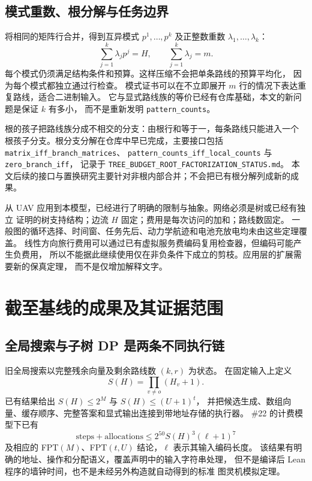\documentclass[UTF8,a4paper,11pt,fontset=fandol]{ctexart}
\theoremstyle{definition}
\newcommand{\repo}[1]{\nolinkurl{#1}}
\begin{document}
\subsection{模式重数、根分解与任务边界}

将相同的矩阵行合并，得到互异模式 $p^1,\ldots,p^k$ 及正整数重数
$\lambda_1,\ldots,\lambda_k$：
\begin{equation}\label{eq:patterns}
\sum_{j=1}^k\lambda_jp^j=H,\qquad
\sum_{j=1}^k\lambda_j=m.
\end{equation}
每个模式仍须满足结构条件和预算。这样压缩不会把单条路线的预算平均化，
因为每个模式都独立通过行检查。
模式证书可以在不立即展开 $m$ 行的情况下表达重复路线，适合二进制输入。
它与显式路线族的等价已经有仓库基础，本文的新问题是保证 $k$ 有多小，
而不是重新发明 \repo{pattern_counts}。

根的孩子把路线族分成不相交的分支：由根行和等于一，每条路线只能进入一个
根孩子分支。根分支分解在仓库中早已完成，主要接口包括
\repo{matrix_iff_branch_matrices}、
\repo{pattern_counts_iff_local_counts} 与 \repo{zero_branch_iff}，
记录于 \repo{TREE_BUDGET_ROOT_FACTORIZATION_STATUS.md}。
本文后续的接口与置换研究主要针对非根内部合并；不会把已有根分解列成新的成果。

从 UAV 应用到本模型，已经进行了明确的限制与抽象。网络必须是树或已经有独立
证明的树支持结构；边流 $H$ 固定；费用是每次访问的加和；路线数固定。
一般图的循环选择、时间窗、任务先后、动力学航迹和电池充放电均未由这些定理覆盖。
线性方向旅行费用可以通过已有虚拟服务费编码复用检查器，但编码可能产生负费用，
所以不能据此继续使用仅在非负条件下成立的剪枝。应用层的扩展需要新的保真定理，
而不是仅增加解释文字。

\section{截至基线的成果及其证据范围}\label{sec:status}

\subsection{全局搜索与子树 DP 是两条不同执行链}

旧全局搜索以完整残余向量及剩余路线数 $(k,r)$ 为状态。
在固定输入上定义
\[
S(H)=\prod_{v\neq o}(H_v+1).
\]
已有结果给出 $S(H)\le 2^M$ 与 $S(H)\le(U+1)^t$，
并把候选生成、数组向量、缓存顺序、完整答案和显式输出连接到带地址存储的执行器。
\#22 的计费模型下已有
\begin{equation}\label{eq:old-cost}
\mathrm{steps}+\mathrm{allocations}
\le 2^{50}S(H)^3(\ell+1)^7
\end{equation}
及相应的 FPT$(M)$、FPT$(t,U)$ 结论，$\ell$ 表示其输入编码长度。
该结果有明确的地址、操作和分配语义，覆盖声明中的输入字符串处理，
但不是编译后 Lean 程序的墙钟时间，也不是未经另外构造就自动得到的标准
图灵机模拟定理。
\end{document}
